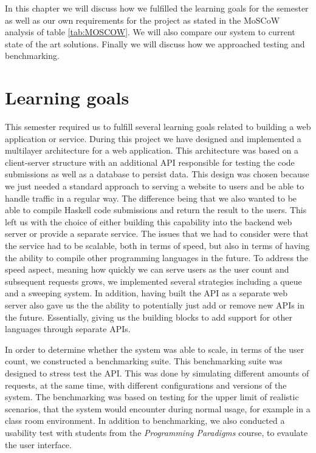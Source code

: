 In this chapter we will discuss how we fulfilled the learning goals for the semester as well as our own requirements for the project as stated in the MoSCoW analysis of table \ref{tab:MOSCOW}. We will also compare our system to current state of the art solutions. Finally we will discuss how we approached testing and benchmarking.

\section{Learning goals}
This semester required us to fulfill several learning goals related to building a web application or service. During this project we have designed and implemented a multilayer architecture for a web application. 
This architecture was based on a client-server structure with an additional API responsible for testing the code submissions as well as a database to persist data. 
This design was chosen because we just needed a standard approach to serving a website to users and be able to handle traffic in a regular way. 
The difference being that we also wanted to be able to compile Haskell code submissions and return the result to the users. This left us with the choice of either building this capability into the backend web server or provide a separate service. 
The issues that we had to consider were that the service had to be scalable, both in terms of speed, but also in terms of having the ability to compile other programming languages in the future. 
To address the speed aspect, meaning how quickly we can serve users as the user count and subsequent requests grows, we implemented several strategies including a queue and a sweeping system.
In addition, having built the API as a separate web server also gave us the the ability to potentially just add or remove new APIs in the future. Essentially, giving us the building blocks to add support for other languages through separate APIs.

In order to determine whether the system was able to scale, in terms of the user count, we constructed a benchmarking suite. This benchmarking suite was designed to stress test the API. 
This was done by simulating different amounts of requests, at the same time, with different configurations and versions of the system. The benchmarking was based on testing for the upper limit of realistic scenarios, that the system would encounter during normal usage, for example in a class room environment.
In addition to benchmarking, we also conducted a usability test with students from the \textit{Programming Paradigms} course, to evaulate the user interface. 



